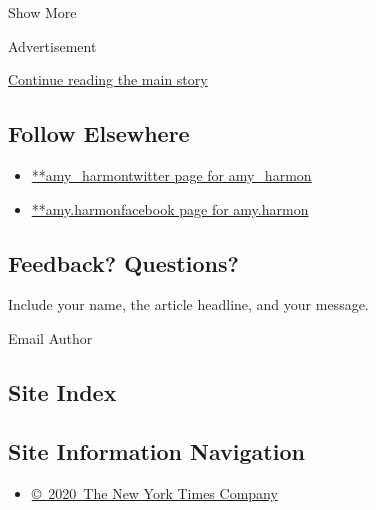 Show More

Advertisement

\protect\hyperlink{after-mid2}{Continue reading the main story}

\hypertarget{follow-elsewhere}{%
\subsection{Follow Elsewhere}\label{follow-elsewhere}}

\begin{itemize}
\tightlist
\item
  \href{https://twitter.com/amy_harmon}{**amy\_harmontwitter page for
  amy\_harmon}
\item
  \href{https://www.facebookcorewwwi.onion/amy.harmon}{**amy.harmonfacebook
  page for amy.harmon}
\end{itemize}

\hypertarget{feedback-questions}{%
\subsection{Feedback? Questions?}\label{feedback-questions}}

Include your name, the article headline, and your message.

Email Author

\hypertarget{site-index}{%
\subsection{Site Index}\label{site-index}}

\hypertarget{site-information-navigation}{%
\subsection{Site Information
Navigation}\label{site-information-navigation}}

\begin{itemize}
\tightlist
\item
  \href{https://help.nytimes3xbfgragh.onion/hc/en-us/articles/115014792127-Copyright-notice}{©~2020~The
  New York Times Company}
\end{itemize}

